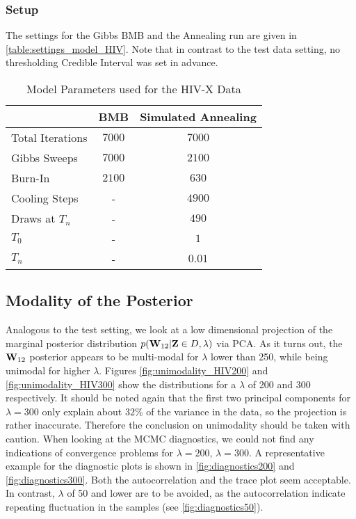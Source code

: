 \subsubsection*{Setup}
The settings for the Gibbs BMB and the Annealing run are given in \autoref{table:settings_model_HIV}.
Note that in contrast to the test data setting, no thresholding Credible Interval was set in advance.
\begin{table}[H]
	\centering
	\caption{Model Parameters used for the HIV-X Data\label{table:settings_model_HIV}}
	\begin{tabular}{l c c}
		& \textbf{BMB}   & \textbf{Simulated Annealing} \\
		\toprule
		Total Iterations  & $7000$         & $7000$                       \\\midrule
		Gibbs Sweeps      & $7000$         & $2100$                        \\
		Burn-In           & $2100$          & $630$                        \\
		Cooling Steps     & -              & $4900$                       \\
		Draws at $T_n$    & -              & $490$                        \\
		$T_0$             & -              & $1$                          \\
		$T_n$             & -              & $0.01$                       
	\end{tabular}
\end{table}


\subsection{Modality of the Posterior}
Analogous to the test setting, we look at a low dimensional projection of the marginal posterior distribution $ p(\mathbf{W}_{12}|\mathbf{Z}\in D, \lambda)$ 
via PCA.
As it turns out, the $\mathbf{W}_{12}$ posterior appears to be multi-modal for $\lambda$ lower than 250,
while being unimodal for higher $\lambda$.
Figures \ref{fig:unimodality_HIV200} and \ref{fig:unimodality_HIV300} show the distributions for a $\lambda$ of 200 and 300 respectively.
It should be noted again that the first two principal components for $\lambda=300$ only explain about $32\%$ of the variance in the data,
so the projection is rather inaccurate.
Therefore the conclusion on unimodality should be taken with caution.
When looking at the MCMC diagnostics, we could not find any indications of convergence problems for $\lambda=200$, $\lambda=300$.
A representative example for the diagnostic plots is shown in \autoref{fig:diagnostics200} and \autoref{fig:diagnostics300}.
Both the autocorrelation and the trace plot seem acceptable.
In contrast, $\lambda$ of 50 and lower are to be avoided, as the autocorrelation indicate repeating fluctuation in the samples (see \autoref{fig:diagnostics50}).

